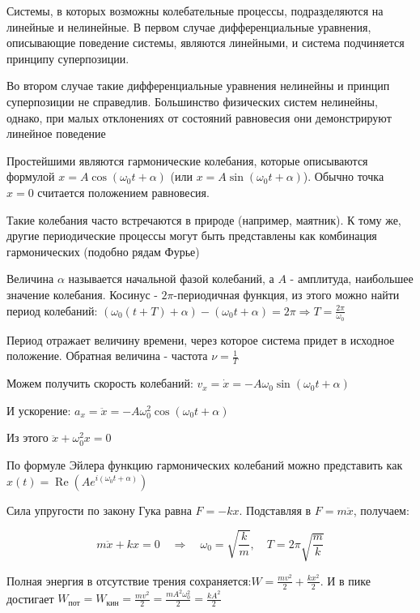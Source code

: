 \documentclass[12pt]{article}
\begin{document}
Системы, в которых возможны колебательные процессы, подразделяются на линейные и нелинейные.
В первом случае дифференциальные уравнения, описывающие поведение системы, являются линейными, 
и система подчиняется принципу суперпозиции.

Во втором случае такие дифференциальные уравнения нелинейны и принцип суперпозиции не справедлив. Большинство
физических систем нелинейны, однако, при малых отклонениях от состояний равновесия они демонстрируют линейное поведение

\mediumvspace

Простейшими являются гармонические колебания, которые описываются формулой $x = A \cos (\omega_0 t + \alpha)$ 
(или $x = A \sin (\omega_0 t + \alpha)$). Обычно точка $x = 0$ считается положением равновесия. 

Такие колебания часто встречаются в природе (например, маятник). К тому же, другие периодические процессы 
могут быть представлены как комбинация гармонических (подобно рядам Фурье)

Величина $\alpha$ называется начальной фазой колебаний, а $A$ - амплитуда, наибольшее значение колебания. 
Косинус - $2\pi$-периодичная функция, из этого можно найти период колебаний: $(\omega_0 (t + T) + \alpha) - (\omega_0 t + \alpha) = 2\pi \Longrightarrow T = \frac{2\pi}{\omega_0}$

Период отражает величину времени, через которое система придет в исходное положение. Обратная величина - частота $\nu = \frac{1}{T}$

Можем получить скорость колебаний: $v_x = \dot x = -A \omega_0 \sin (\omega_0 t + \alpha)$

И ускорение: $a_x = \ddot x = -A \omega_0^2 \cos (\omega_0 t + \alpha)$

Из этого $\ddot x + \omega_0^2 x = 0$

По формуле Эйлера функцию гармонических колебаний можно представить как $x(t) = \operatorname{Re} (Ae^{i(\omega_0 t + \alpha)})$

 Сила упругости по закону Гука равна $F = -kx$. Подставляя в $F = m\ddot{x}$, получаем:

\[
m\ddot{x} + kx = 0 \quad \Longrightarrow \quad \omega_0 = \sqrt{\frac{k}{m}}, \quad T = 2\pi\sqrt{\frac{m}{k}}
\]

Полная энергия в отсутствие трения сохраняется:$W = \frac{mv^2}{2} + \frac{kx^2}{2}$.
И в пике достигает $W_{\text{пот}} = W_{\text{кин}} = \frac{mv^2}{2} = \frac{mA^2\omega_0^2}{2} = \frac{kA^2}{2}$
    
\end{document}
